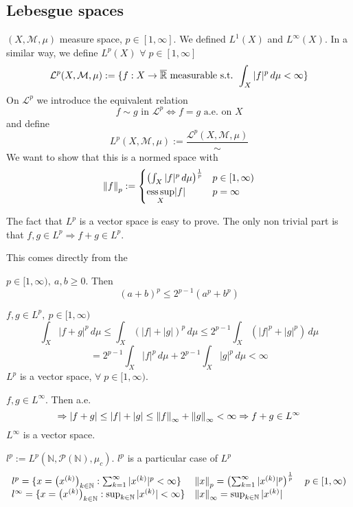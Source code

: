 \subsection*{Lebesgue spaces} 
\((X, \mathcal{M}, \mu)\) measure space, \(p \in \left[1, \infty\right]\). We defined \(L^1(X)\) and \(L^\infty(X)\). 
In a similar way, we define \(L^p(X)\) \(\forall \; p \in \left[1, \infty\right]\)
\[
    \mathcal{L}^p (X, \mathcal{M}, \mu) := \{ f: X \rightarrow \overline{\mathbb{R}} \text{ measurable s.t. } \int_X |f|^p \, d\mu < \infty\}
\]
On \(\mathcal{L}^p\) we introduce the equivalent relation
\[
    f \sim g \text{ in } \mathcal{L}^p \Leftrightarrow f=g \text{ a.e. on } X 
\]
and define 
\[
    {L}^p (X, \mathcal{M}, \mu) := \frac{\mathcal{L}^p (X, \mathcal{M}, \mu)}{\sim}
\]
We want to show that this is a normed space with
\[
    \norm{f}_p := 
    \begin{cases}
        \left( \int_X |f|^p \, d\mu \right)^{\frac{1}{p}}  & p \in [1, \infty) \\
        \underset{X}{\text{ess}\, \text{sup}} |f| & p = \infty
    \end{cases}
\]

The fact that \(L^p\) is a vector space is easy to prove. The only non trivial part is that \(f, g \in L^p \Rightarrow f+g \in L^p\).

This comes directly from the 
\begin{lemma}
    \(p \in [1, \infty), \ a, b \geq 0\). Then 
    \[
        \left(a+b\right)^p \leq 2^{p-1} \left(a^p+b^p\right) 
    \]
\end{lemma}

\(f, g \in L^p, \ p \in [1, \infty)\)
\[
    \int_X |f+g|^p \, d\mu \leq \int_X (|f|+|g|)^p \, d\mu 
    \leq 2^{p-1} \int_X (|f|^p+|g|^p) \, d\mu
\]
\[
    = 2^{p-1} \int_X |f|^p \, d\mu + 2^{p-1} \int_X |g|^p \, d\mu < \infty
\]
\(L^p\) is a vector space, \(\forall \; p \in [1, \infty)\).


\(f, g \in L^\infty\). Then a.e. 
\[
    \Rightarrow |f+g| \leq |f|+|g| \leq \norm{f}_\infty + \norm{g}_\infty < \infty
    \Rightarrow f+g \in L^\infty
\]
\(L^\infty\) is a vector space. 

\begin{remark}
    \(l^p := L^p (\mathbb{N}, \mathcal{P}(\mathbb{N}), \mu_c )\). \(l^p\) is a particular case of \(L^p\)
    \[
    \begin{array}{ll}
        l^p = \{ x = \left(x^{(k)}\right)_{k \in \mathbb{N}} : \sum_{k=1}^\infty |x^{(k)}|^p < \infty \} 
        & \norm{x}_p = \left( \sum_{k=1}^\infty |x^{(k)}|^p \right)^{\frac{1}{p}} \quad p \in [1, \infty)
        \\ l^\infty = \{ x = \left(x^{(k)}\right)_{k \in \mathbb{N}} : \sup_{k \in \mathbb{N}} |x^{(k)}| < \infty \} 
        & \norm{x}_\infty = \sup_{k \in \mathbb{N}} |x^{(k)}|
    \end{array}
    \]
\end{remark}

